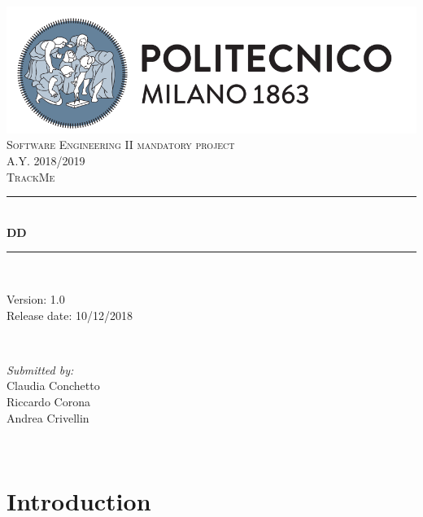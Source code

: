 \documentclass[11pt]{article}
\begin{document}
\begin{titlepage}
	\centering
	\vspace*{0.5 cm}
	\includegraphics[scale = 0.5]{PolimiLogo.png}\\[1.0 cm]
	\textsc{\Large Software Engineering II mandatory project}\\[0.2 cm]
	\textsc{\Large A.Y. 2018/2019}\\[2.0 cm]
	\textsc{\LARGE TrackMe}\\[0.5 cm]
	\rule{\linewidth}{0.2 mm}\\[0.4 cm]
	{\huge \bfseries DD}\\[0.4 cm]

	\rule{\linewidth}{0.2 mm}\\[1.5 cm]

	\begin{minipage}{0.4\textwidth}
		\begin{flushleft} \large
			Version: 1.0\\
			Release date: 10/12/2018\\
		\end{flushleft}
	\end{minipage}~
	\begin{minipage}{0.4\textwidth}
		\begin{flushright} \large
			\emph{Submitted by:}\\
			Claudia Conchetto\\
			Riccardo Corona\\
			Andrea Crivellin\\
		\end{flushright}
	\end{minipage}\\[2 cm]
\end{titlepage}

\tableofcontents
\newpage

\section{Introduction}


\clearpage
\end{document}
